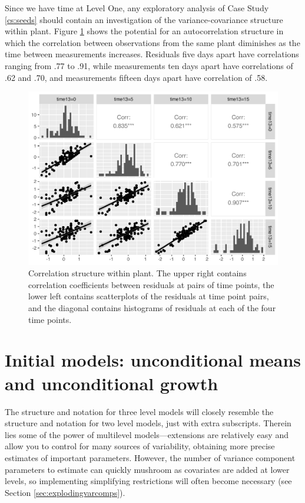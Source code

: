\documentclass[
]{krantz}
\begin{document}
Since we have time at Level One, any exploratory analysis of Case Study \ref{cs:seeds} should contain an investigation of the variance-covariance structure within plant. Figure \ref{fig:corrstruct} shows the potential for an autocorrelation structure in which the correlation between observations from the same plant diminishes as the time between measurements increases. Residuals five days apart have correlations ranging from .77 to .91, while measurements ten days apart have correlations of .62 and .70, and measurements fifteen days apart have correlation of .58.

\begin{figure}

{\centering \includegraphics[width=0.6\linewidth]{bookdown-BeyondMLR_files/figure-latex/corrstruct-1} 

}

\caption{Correlation structure within plant.  The upper right contains correlation coefficients between residuals at pairs of time points, the lower left contains scatterplots of the residuals at time point pairs, and the diagonal contains histograms of residuals at each of the four time points.}\label{fig:corrstruct}
\end{figure}

\hypertarget{initialmodels-3level}{%
\section{Initial models: unconditional means and unconditional growth}\label{initialmodels-3level}}

The structure and notation for three level models will closely resemble the structure and notation for two level models, just with extra subscripts. Therein lies some of the power of multilevel models---extensions are relatively easy and allow you to control for many sources of variability, obtaining more precise estimates of important parameters. However, the number of variance component parameters to estimate can quickly mushroom as covariates are added at lower levels, so implementing simplifying restrictions will often become necessary (see Section \ref{sec:explodingvarcomps}).
\end{document}
